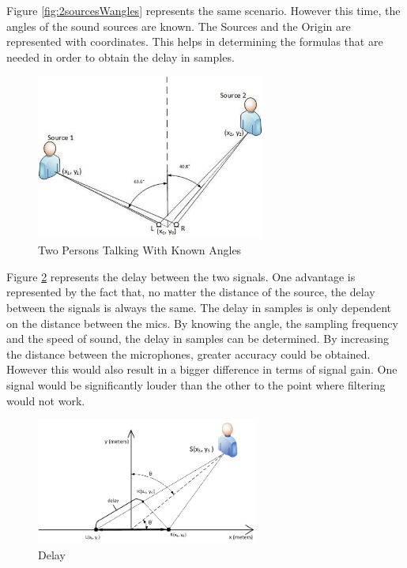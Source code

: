 Figure \ref{fig:2sourcesWangles} represents the same scenario. However this time, 
the angles of the sound sources are known. The Sources and the Origin are 
represented with coordinates. This helps in determining the formulas that are 
needed in order to obtain the delay in samples.

\begin{figure}[htp]
	\centering
	\includegraphics[width=0.67\textwidth]{Illustrations/2sourcesWanglesAndPossition.jpg}
	\caption{Two Persons Talking With Known Angles}
	\label{fig:2sourcesWanglesAndPossition}
\end{figure}

\newpage

Figure \ref{fig:zoomedin1} represents the delay between the two signals. One 
advantage is represented by the fact that, no matter the distance of the source, 
the delay between the signals is always the same. The delay in samples is only 
dependent on the distance between the mics. By knowing the angle, the sampling 
frequency and the speed of sound, the delay in samples can be determined. By 
increasing the distance between the microphones, greater accuracy could be 
obtained. However this would also result in a bigger difference in terms of signal 
gain. One signal would be significantly louder than the other to the point where 
filtering would not work.


\begin{figure}[htp]
	\centering
	\includegraphics[width=0.65\textwidth]{Illustrations/delayDrawingForEquations.jpg}
	\caption{Delay}
	\label{fig:zoomedin1}
\end{figure}

